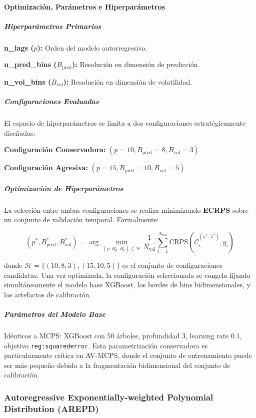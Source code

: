 \paragraph{Optimización, Parámetros e Hiperparámetros}
\subparagraph{Hiperparámetros Primarios}

\textbf{n\_lags ($p$):} Orden del modelo autorregresivo.


\textbf{n\_pred\_bins ($B_{\text{pred}}$):} Resolución en dimensión de predicción.


\textbf{n\_vol\_bins ($B_{\text{vol}}$):} Resolución en dimensión de volatilidad.





\subparagraph{Configuraciones Evaluadas}

El espacio de hiperparámetros se limita a dos configuraciones estratégicamente diseñadas:

\textbf{Configuración Conservadora:} $(p=10, B_{\text{pred}}=8, B_{\text{vol}}=3)$

\textbf{Configuración Agresiva:} $(p=15, B_{\text{pred}}=10, B_{\text{vol}}=5)$

\subparagraph{Optimización de Hiperparámetros}

La selección entre ambas configuraciones se realiza minimizando \textbf{ECRPS} sobre un conjunto de validación temporal. Formalmente:

\begin{equation}
(p^*, B_{\text{pred}}^*, B_{\text{vol}}^*) = \arg\min_{(p, B_p, B_v) \in \mathcal{H}} \frac{1}{N_{\text{val}}} \sum_{i=1}^{N_{\text{val}}} \text{CRPS}(\mathcal{C}_i^{(\kappa^*,\lambda^*)}, y_i)
\end{equation}

donde $\mathcal{H} = \{(10,8,3), (15,10,5)\}$ es el conjunto de configuraciones candidatas. Una vez optimizada, la configuración seleccionada se congela fijando simultáneamente el modelo base XGBoost, los bordes de bins bidimensionales, y los artefactos de calibración.

\subparagraph{Parámetros del Modelo Base}

Idénticos a MCPS: XGBoost con 50 árboles, profundidad 3, learning rate 0.1, objetivo \texttt{reg:squarederror}. Esta parametrización conservadora es particularmente crítica en AV-MCPS, donde el conjunto de entrenamiento puede ser más pequeño debido a la fragmentación bidimensional del conjunto de calibración.


\subsubsection{Autoregressive Exponentially-weighted Polynomial Distribution (AREPD)}
\label{subsec:AREPD}
